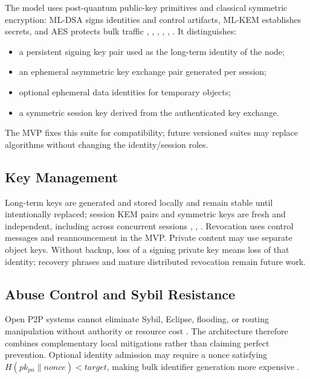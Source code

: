 \documentclass[
  12pt,
  oneside,
  a4paper,
  chapter=TITLE,
  section=TITLE,
  english,
  brazil
]{abntex2}
\begin{document}
The model uses post-quantum public-key primitives and classical symmetric encryption: ML-DSA signs identities and control artifacts, ML-KEM establishes secrets, and AES protects bulk traffic \cite{shor1997quantum}, \cite{regev2009lwe}, \cite{bos2017kyber}, \cite{nist2024fips203}, \cite{nist2024fips204}, \cite{rfc8452}. It distinguishes:

\begin{itemize}
    \item a persistent signing key pair used as the long-term identity of the node;
    \item an ephemeral asymmetric key exchange pair generated per session;
    \item optional ephemeral data identities for temporary objects;
    \item a symmetric session key derived from the authenticated key exchange.
\end{itemize}

The MVP fixes this suite for compatibility; future versioned suites may replace algorithms without changing the identity/session roles.

\subsection{Key Management}

Long-term keys are generated and stored locally and remain stable until intentionally replaced; session KEM pairs and symmetric keys are fresh and independent, including across concurrent sessions \cite{mirzaei2018pk}, \cite{bos2017kyber}, \cite{nist2024fips203}. Revocation uses control messages and reannouncement in the MVP. Private content may use separate object keys. Without backup, loss of a signing private key means loss of that identity; recovery phrases and mature distributed revocation remain future work.

\subsection{Abuse Control and Sybil Resistance}

Open P2P systems cannot eliminate Sybil, Eclipse, flooding, or routing manipulation without authority or resource cost \cite{douceur2002sybil}. The architecture therefore combines complementary local mitigations rather than claiming perfect prevention. Optional identity admission may require a nonce satisfying $H(pk_{pn} \parallel nonce) < target$, making bulk identifier generation more expensive \cite{baumgart2007skademlia}.
\end{document}

